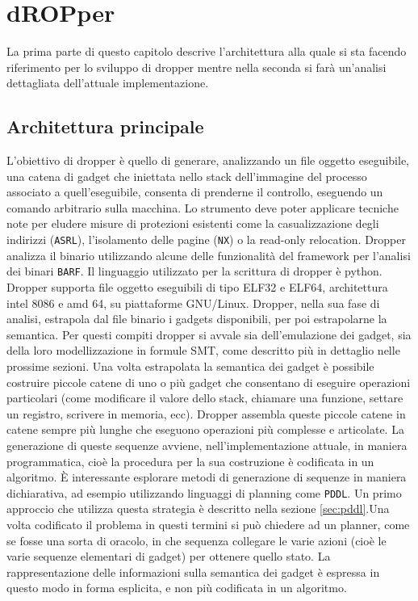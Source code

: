 \chapter{dROPper}

La prima parte di questo capitolo descrive l'architettura alla quale
si sta facendo riferimento per lo sviluppo di dropper mentre nella
seconda si farà un'analisi dettagliata dell'attuale implementazione.

\section{Architettura principale}

L'obiettivo di dropper è quello di generare, analizzando un file
oggetto eseguibile, una catena di gadget che iniettata nello stack
dell'immagine del processo associato a quell'eseguibile, consenta di
prenderne il controllo, eseguendo un comando arbitrario sulla
macchina. Lo strumento deve poter applicare tecniche note per eludere
misure di protezioni esistenti come la casualizzazione degli indirizzi
(\lstinline{ASRL}), l'isolamento delle pagine (\lstinline{NX}) o la
read-only relocation. Dropper analizza il binario utilizzando alcune
delle funzionalità del framework per l'analisi dei binari
\lstinline{BARF}. Il linguaggio utilizzato per la scrittura di dropper
è python. Dropper supporta file oggetto eseguibili di tipo ELF32 e
ELF64, architettura intel 8086 e amd 64, su piattaforme
GNU/Linux. Dropper, nella sua fase di analisi, estrapola dal file
binario i gadgets disponibili, per poi estrapolarne la semantica. Per
questi compiti dropper si avvale sia dell'emulazione dei gadget, sia
della loro modellizzazione in formule SMT, come descritto più in
dettaglio nelle prossime sezioni. Una volta estrapolata la semantica
dei gadget è possibile costruire piccole catene di uno o più gadget
che consentano di eseguire operazioni particolari (come modificare il
valore dello stack, chiamare una funzione, settare un registro,
scrivere in memoria, ecc). Dropper assembla queste piccole catene in
catene sempre più lunghe che eseguono operazioni più complesse e
articolate. La generazione di queste sequenze avviene,
nell'implementazione attuale, in maniera programmatica, cioè la
procedura per la sua costruzione è codificata in un algoritmo. È
interessante esplorare metodi di generazione di sequenze in maniera
dichiarativa, ad esempio utilizzando linguaggi di planning come
\lstinline{PDDL}\cite{pddl-97}. Un primo approccio che utilizza questa
strategia è descritto nella sezione \ref{sec:pddl}.Una volta
codificato il problema in questi termini si può chiedere ad un
planner, come se fosse una sorta di oracolo, in che sequenza collegare
le varie azioni (cioè le varie sequenze elementari di gadget) per
ottenere quello stato. La rappresentazione delle informazioni sulla
semantica dei gadget è espressa in questo modo in forma esplicita, e
non più codificata in un algoritmo.

